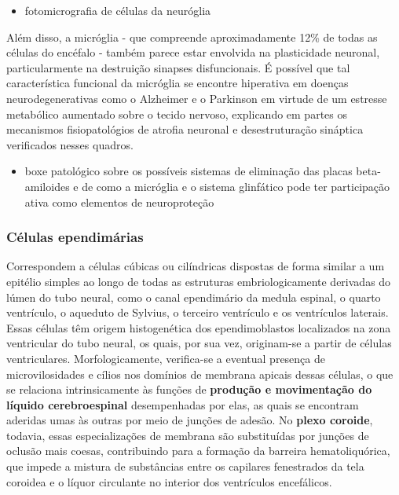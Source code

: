 \documentclass[
]{book}
\providecommand{\tightlist}{%
  \setlength{\itemsep}{0pt}\setlength{\parskip}{0pt}}
\theoremstyle{definition}
\theoremstyle{definition}
\theoremstyle{definition}
\theoremstyle{definition}
\theoremstyle{remark}
\begin{document}
\begin{itemize}
\tightlist
\item
  fotomicrografia de células da neuróglia
\end{itemize}

Além disso, a micróglia - que compreende aproximadamente 12\% de todas as células do encéfalo - também parece estar envolvida na plasticidade neuronal, particularmente na destruição sinapses disfuncionais. É possível que tal característica funcional da micróglia se encontre hiperativa em doenças neurodegenerativas como o Alzheimer e o Parkinson em virtude de um estresse metabólico aumentado sobre o tecido nervoso, explicando em partes os mecanismos fisiopatológios de atrofia neuronal e desestruturação sináptica verificados nesses quadros.

\begin{itemize}
\tightlist
\item
  boxe patológico sobre os possíveis sistemas de eliminação das placas beta-amiloides e de como a micróglia e o sistema glinfático pode ter participação ativa como elementos de neuroproteção
\end{itemize}

\hypertarget{cuxe9lulas-ependimuxe1rias}{%
\subsubsection*{Células ependimárias}\label{cuxe9lulas-ependimuxe1rias}}

Correspondem a células cúbicas ou cilíndricas dispostas de forma similar a um epitélio simples ao longo de todas as estruturas embriologicamente derivadas do lúmen do tubo neural, como o canal ependimário da medula espinal, o quarto ventrículo, o aqueduto de Sylvius, o terceiro ventrículo e os ventrículos laterais. Essas células têm origem histogenética dos ependimoblastos localizados na zona ventricular do tubo neural, os quais, por sua vez, originam-se a partir de células ventriculares. Morfologicamente, verifica-se a eventual presença de microvilosidades e cílios nos domínios de membrana apicais dessas células, o que se relaciona intrinsicamente às funções de \textbf{produção e movimentação do líquido cerebroespinal} desempenhadas por elas, as quais se encontram aderidas umas às outras por meio de junções de adesão. No \textbf{plexo coroide}, todavia, essas especializações de membrana são substituídas por junções de oclusão mais coesas, contribuindo para a formação da barreira hematoliquórica, que impede a mistura de substâncias entre os capilares fenestrados da tela coroidea e o líquor circulante no interior dos ventrículos encefálicos.
\end{document}

